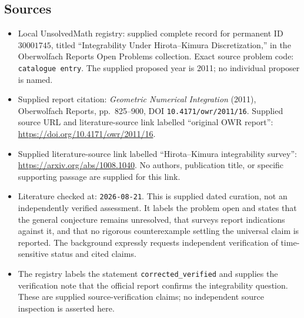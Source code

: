 \documentclass[11pt]{article}
\begin{document}
\subsection{Sources}
\begin{itemize}
\item Local UnsolvedMath registry: supplied complete record for permanent ID \(30001745\), titled ``Integrability Under Hirota--Kimura Discretization,'' in the Oberwolfach Reports Open Problems collection. Exact source problem code: \texttt{catalogue entry}. The supplied proposed year is 2011; no individual proposer is named.
\item Supplied report citation: \emph{Geometric Numerical Integration} (2011), Oberwolfach Reports, pp.\ 825--900, DOI \texttt{10.4171/owr/2011/16}. Supplied source URL and literature-source link labelled ``original OWR report'': \url{https://doi.org/10.4171/owr/2011/16}.
\item Supplied literature-source link labelled ``Hirota--Kimura integrability survey'': \url{https://arxiv.org/abs/1008.1040}. No authors, publication title, or specific supporting passage are supplied for this link.
\item Literature checked at: \texttt{2026-08-21}. This is supplied dated curation, not an independently verified assessment. It labels the problem open and states that the general conjecture remains unresolved, that surveys report indications against it, and that no rigorous counterexample settling the universal claim is reported. The background expressly requests independent verification of time-sensitive status and cited claims.
\item The registry labels the statement \texttt{corrected\_verified} and supplies the verification note that the official report confirms the integrability question. These are supplied source-verification claims; no independent source inspection is asserted here.
\end{itemize}
\end{document}
